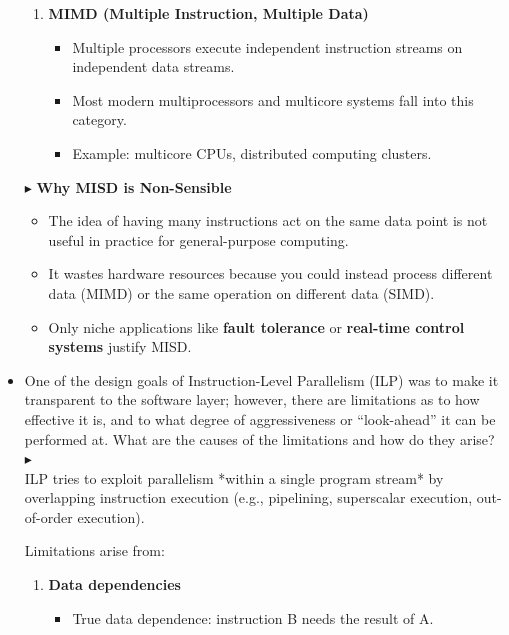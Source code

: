 \documentclass[12pt]{article}
\begin{document}
\begin{itemize}[left = 0pt]
\begin{enumerate}
        \item \textbf{MIMD (Multiple Instruction, Multiple Data)}
        \begin{itemize}
            \item Multiple processors execute independent instruction streams on independent data streams.
            \item Most modern multiprocessors and multicore systems fall into this category.
            \item Example: multicore CPUs, distributed computing clusters.
        \end{itemize}
    \end{enumerate}
    \newpage
    $\blacktriangleright$ \textbf{Why MISD is Non-Sensible}
    \begin{itemize}
        \item The idea of having many instructions act on the same data point is not useful in practice for general-purpose computing.
        \item It wastes hardware resources because you could instead process different data (MIMD) or the same operation on different data (SIMD).
        \item Only niche applications like \textbf{fault tolerance} or \textbf{real-time control systems} justify MISD. 
    \end{itemize}

    \item One of the design goals of Instruction-Level Parallelism (ILP) was to make it transparent to the software layer; however, there are limitations as to how effective it is, and to what degree of aggressiveness or “look-ahead” it can be performed at. What are the causes of the limitations and how do they arise?\\
    $\blacktriangleright$ \\
    ILP tries to exploit parallelism *within a single program stream* by overlapping instruction execution (e.g., pipelining, superscalar execution, out-of-order execution).
    
    Limitations arise from:
    \begin{enumerate}
        \item \textbf{Data dependencies}
        \begin{itemize}
            \item True data dependence: instruction B needs the result of A.
        \end{itemize}


\end{enumerate}
\end{itemize}
\end{document}

